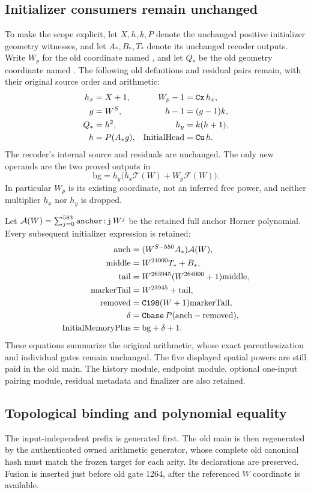 \documentclass[11pt,letterpaper]{article}
\theoremstyle{definition}\newtheorem{definition}[theorem]{Definition}
\theoremstyle{remark}\newtheorem{remark}[theorem]{Remark}
\newcommand{\op}[1]{\mathrm{#1}}
\newcommand{\code}[1]{\texttt{\detokenize{#1}}}
\newcommand{\calT}{\mathcal T}\newcommand{\calF}{\mathcal F}
\begin{document}
\subsection{Initializer consumers remain unchanged}
To make the scope explicit, let $X,h,k,P$ denote the unchanged positive initializer geometry witnesses, and let $A_*,B_*,T_*$ denote its unchanged recoder outputs. Write $W_p$ for the old coordinate named \code{Wp}, and let $Q_*$ be the old geometry coordinate named \code{Q}. The following old definitions and residual pairs remain, with their original source order and arithmetic:
\begin{align*}
 h_x&=X+1,& W_p-1&=\code{Cx}\,h_x,\\
 g&=W^S,& h-1&=(g-1)k,\\
 Q_*&=h^2,& h_y&=k(h+1),\\
 h&=P(A_*g),&\op{InitialHead}&=\code{Cu}\,h.
\end{align*}
The recoder's internal source and residuals are unchanged. The only new operands are the two proved outputs in
\begin{equation}\label{ptr:fu:eq:bg}
 \op{bg}=h_y\bigl(h_x\calT(W)+W_p\calF(W)\bigr).
\end{equation}
In particular $W_p$ is its existing coordinate, not an inferred free power, and neither multiplier $h_x$ nor $h_y$ is dropped.

Let $\mathcal A(W)=\sum_{j=0}^{583}\code{anchor:j}\,W^j$ be the retained full anchor Horner polynomial. Every subsequent initializer expression is retained:
\begin{align*}
 \op{anch}&=(W^{S-550}A_*)\mathcal A(W),\\
 \op{middle}&=W^{24000}T_*+B_*,\\
 \op{tail}&=W^{263945}(W^{264000}+1)\op{middle},\\
 \op{markerTail}&=W^{23945}+\op{tail},\\
 \op{removed}&=\code{C198}(W+1)\op{markerTail},\\
 \delta&=\code{Cbase}\,P(\op{anch}-\op{removed}),\\
 \op{InitialMemoryPlus}&=\op{bg}+\delta+1.
\end{align*}
These equations summarize the original arithmetic, whose exact parenthesization and individual gates remain unchanged. The five displayed spatial powers are still paid in the old main. The history module, endpoint module, optional one-input pairing module, residual metadata and finalizer are also retained.

\subsection{Topological binding and polynomial equality}
The input-independent prefix is generated first. The old main is then regenerated by the authenticated owned arithmetic generator, whose complete old canonical hash must match the frozen target for each arity. Its declarations are preserved. Fusion is inserted just before old gate 1264, after the referenced $W$ coordinate is available.
\end{document}

